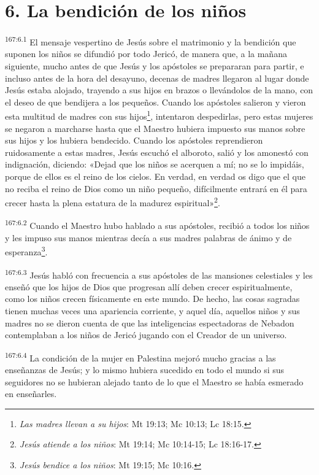 \section*{6. La bendición de los niños}
\par
\textsuperscript{167:6.1} El mensaje vespertino de Jesús sobre el matrimonio y la bendición que suponen los niños se difundió por todo Jericó, de manera que, a la mañana siguiente, mucho antes de que Jesús y los apóstoles se prepararan para partir, e incluso antes de la hora del desayuno, decenas de madres llegaron al lugar donde Jesús estaba alojado, trayendo a sus hijos en brazos o llevándolos de la mano, con el deseo de que bendijera a los pequeños. Cuando los apóstoles salieron y vieron esta multitud de madres con sus hijos\footnote{\textit{Las madres llevan a su hijos}: Mt 19:13; Mc 10:13; Lc 18:15.}, intentaron despedirlas, pero estas mujeres se negaron a marcharse hasta que el Maestro hubiera impuesto sus manos sobre sus hijos y los hubiera bendecido. Cuando los apóstoles reprendieron ruidosamente a estas madres, Jesús escuchó el alboroto, salió y los amonestó con indignación, diciendo: «Dejad que los niños se acerquen a mí; no se lo impidáis, porque de ellos es el reino de los cielos. En verdad, en verdad os digo que el que no reciba el reino de Dios como un niño pequeño, difícilmente entrará en él para crecer hasta la plena estatura de la madurez espiritual»\footnote{\textit{Jesús atiende a los niños}: Mt 19:14; Mc 10:14-15; Lc 18:16-17.}.

\par
\textsuperscript{167:6.2} Cuando el Maestro hubo hablado a sus apóstoles, recibió a todos los niños y les impuso sus manos mientras decía a sus madres palabras de ánimo y de esperanza\footnote{\textit{Jesús bendice a los niños}: Mt 19:15; Mc 10:16.}.

\par
\textsuperscript{167:6.3} Jesús habló con frecuencia a sus apóstoles de las mansiones celestiales y les enseñó que los hijos de Dios que progresan allí deben crecer espiritualmente, como los niños crecen físicamente en este mundo. De hecho, las cosas sagradas tienen muchas veces una apariencia corriente, y aquel día, aquellos niños y sus madres no se dieron cuenta de que las inteligencias espectadoras de Nebadon contemplaban a los niños de Jericó jugando con el Creador de un universo.

\par
\textsuperscript{167:6.4} La condición de la mujer en Palestina mejoró mucho gracias a las enseñanzas de Jesús; y lo mismo hubiera sucedido en todo el mundo si sus seguidores no se hubieran alejado tanto de lo que el Maestro se había esmerado en enseñarles.

